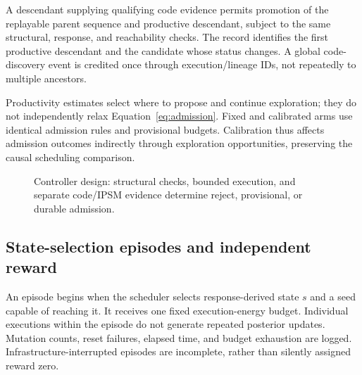 \documentclass[final,5p,times,number]{elsarticle}
\newcommand{\gcode}{G_{\mathrm{code}}}
\newcommand{\gstate}{G_{\mathrm{state}}}
\begin{document}
A descendant supplying qualifying code evidence permits promotion of the replayable parent sequence and productive descendant, subject to the same structural, response, and reachability checks. The record identifies the first productive descendant and the candidate whose status changes. A global code-discovery event is credited once through execution/lineage IDs, not repeatedly to multiple ancestors.

Productivity estimates select where to propose and continue exploration; they do not independently relax Equation~\ref{eq:admission}. Fixed and calibrated arms use identical admission rules and provisional budgets. Calibration thus affects admission outcomes indirectly through exploration opportunities, preserving the causal scheduling comparison.

\begin{figure}[!tbp]
\centering
{}
\caption{Controller design: structural checks, bounded execution, and separate code/IPSM evidence determine reject, provisional, or durable admission.}
\label{fig:architecture}
\end{figure}

\subsection{State-selection episodes and independent reward}
An episode begins when the scheduler selects response-derived state $s$ and a seed capable of reaching it. It receives one fixed execution-energy budget. Individual executions within the episode do not generate repeated posterior updates. Mutation counts, reset failures, elapsed time, and budget exhaustion are logged. Infrastructure-interrupted episodes are incomplete, rather than silently assigned reward zero.
\end{document}
